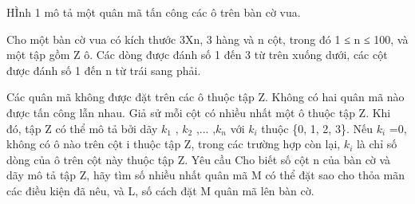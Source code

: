 HÌnh 1 mô tả một quân mã tấn công các ô trên bàn cờ vua.  

   Cho một bàn cờ vua có kích thước 3Xn, 3 hàng và n cột, trong đó 1 ≤ n ≤ 100, và một tập gồm Z ô. Các dòng được đánh số 1 đến 3 từ   trên xuống dưới, các cột được đánh số 1 đến n từ trái sang phải.  

   Các quân mã không được đặt trên các ô thuộc tập Z. Không có hai quân mã nào được tấn công lẫn nhau. Giả sử mỗi cột có nhiều nhất một ô   thuộc tập Z. Khi đó, tập Z có thể mô tả bởi dãy $k_{1}$   , $k_{2}$   ,... ,$k_{n}$   với $k_{i}$   thuộc \{0, 1, 2, 3\}. Nếu   $k_{i}$   =0, không có ô nào trên cột i thuộc tập Z, trong các trường hợp còn lại, $k_{i}$   là chỉ số dòng của ô trên cột này thuộc   tập Z.
   Yêu cầu  
Cho biết số cột n của bàn cờ và dãy mô tả tập Z, hãy tìm số nhiều nhất quân mã M có thể đặt sao cho thỏa mãn các điều kiện đã nêu, và L,   số cách đặt M quân mã lên bàn cờ.